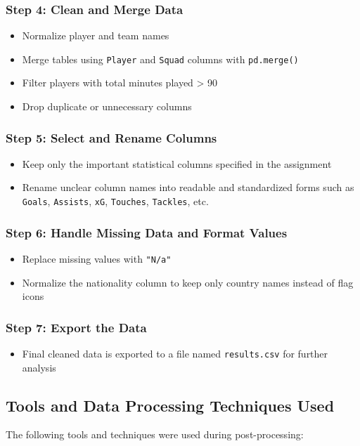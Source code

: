 \documentclass[12pt,a4paper]{article}
\begin{document}
\subsubsection{Step 4: Clean and Merge Data}
\begin{itemize}
\item Normalize player and team names
\item Merge tables using \texttt{Player} and \texttt{Squad} columns with \texttt{pd.merge()}
\item Filter players with total minutes played > 90
\item Drop duplicate or unnecessary columns
\end{itemize}

\subsubsection{Step 5: Select and Rename Columns}
\begin{itemize}
\item Keep only the important statistical columns specified in the assignment
\item Rename unclear column names into readable and standardized forms such as \texttt{Goals}, \texttt{Assists}, \texttt{xG}, \texttt{Touches}, \texttt{Tackles}, etc.
\end{itemize}

\subsubsection{Step 6: Handle Missing Data and Format Values}
\begin{itemize}
\item Replace missing values with \texttt{"N/a"}
\item Normalize the nationality column to keep only country names instead of flag icons
\end{itemize}

\subsubsection{Step 7: Export the Data}
\begin{itemize}
\item Final cleaned data is exported to a file named \texttt{results.csv} for further analysis
\end{itemize}

\subsection{Tools and Data Processing Techniques Used}
The following tools and techniques were used during post-processing:
\end{document}
